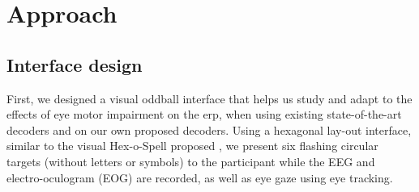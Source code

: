 \section{Approach}

\subsection{Interface design}


First, we designed a visual oddball interface that helps us study and adapt
to the effects of eye motor impairment on the \ac{erp}, when using existing state-of-the-art
decoders and on our own proposed decoders.
Using a hexagonal lay-out interface, similar to the visual Hex-o-Spell proposed
\textcite{Treder2010}, we present six flashing circular targets
(without letters or symbols) to the participant while the EEG and
electro-oculogram (EOG) are recorded, as well as eye gaze using eye tracking.

